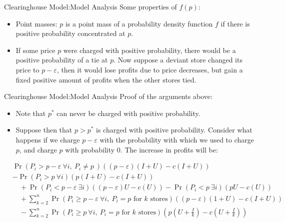 \documentclass[aspectratio=169]{beamer}  %
\begin{document}
\begin{frame}{Clearinghouse Model:Model Analysis}
    Some properties of $f(p)$:
    \begin{itemize}
        \item Point masses: $p$ is a point mass of a probability density function $f$ if there is positive probability concentrated at $p$.
        \item If some price $p$ were charged with positive probability, there would be a positive probability of a tie at $p$. Now suppose a deviant store changed its price to $p-\varepsilon$, then it would lose profits due to price decreases, but gain a fixed positive amount of profits when the other stores tied.
    \end{itemize}
\end{frame}

\begin{frame}{Clearinghouse Model:Model Analysis}
    Proof of the arguments above:
    \begin{itemize}
        \item Note that $p^*$ can never be charged with positive probability.
        \item Suppose then that $p>p^*$ is charged with positive probability. Consider what happens if we charge $p-\varepsilon$ with the probability with which we used to charge $p$, and charge $p$ with probability 0. The increase in profits will be:
    \end{itemize}
    \begin{align*}
        & \Pr\left( P_i > p - \varepsilon \ \forall i,\ P_i \neq p \  \right) \left( (p - \varepsilon)(I + U) - c(I + U) \right) \\
        &- \Pr\left( P_i > p \ \forall i \right) \left( p(I + U) - c(I + U) \right) \\
        & \quad + \Pr\left( P_i < p - \varepsilon \ \exists i \right) \left( (p - \varepsilon)U - c(U) \right)  - \Pr\left( P_i < p \ \exists i \right) \left( pU - c(U) \right) \\
        & \quad + \sum_{k=2}^{n} \Pr\left( P_i \geq p - \varepsilon \ \forall i,\ P_i = p \text{ for } k \text{ stores} \right) \left( (p - \varepsilon)(1 + U) - c(I + U) \right) \\
        & \quad - \sum_{k=2}^{n} \Pr\left( P_i \geq p \ \forall i,\ P_i = p \text{ for } k \text{ stores} \right) \left( p\left( U+\frac{I}{k} \right) - c\left( U + \frac{I}{k} \right) \right) 
        \end{align*}
\end{frame}
\end{document}

